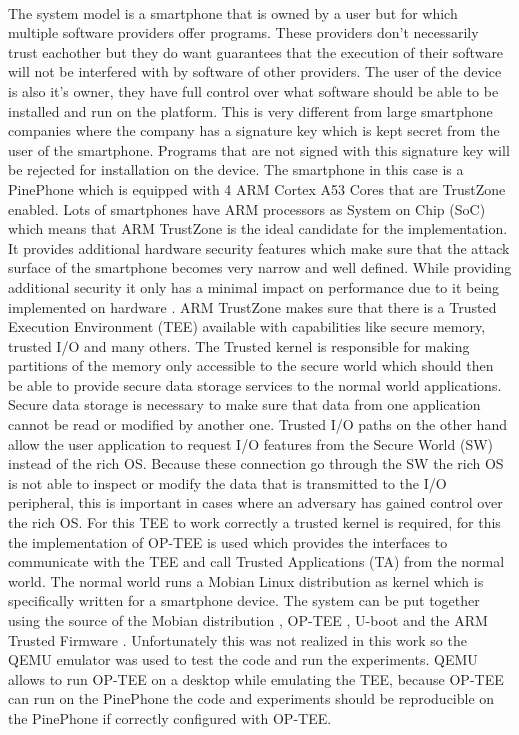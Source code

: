 \documentclass{report}
\begin{document}
\paragraph*{}
The system model is a smartphone that is owned by a user but for which multiple software providers offer programs. These providers don't necessarily trust eachother but they do want guarantees that the execution of their software will not be interfered with by software of other providers. The user of the device is also it's owner, they have full control over what software should be able to be installed and run on the platform. This is very different from large smartphone companies where the company has a signature key which is kept secret from the user of the smartphone. Programs that are not signed with this signature key will be rejected for installation on the device. The smartphone in this case is a PinePhone which is equipped with 4 ARM Cortex A53 Cores that are TrustZone enabled. Lots of smartphones have ARM processors as System on Chip (SoC) which means that ARM TrustZone is the ideal candidate for the implementation. It provides additional hardware security features which make sure that the attack surface of the smartphone becomes very narrow and well defined. While providing additional security it only has a minimal impact on performance due to it being implemented on hardware \cite{AmacherJulien2019Otpo} \cite{HuaZhichao2021Tpcf}. ARM TrustZone makes sure that there is a Trusted Execution Environment (TEE) available with capabilities like secure memory, trusted I/O and many others. The Trusted kernel is responsible for making partitions of the memory only accessible to the secure world which should then be able to provide secure data storage services to the normal world applications. Secure data storage is necessary to make sure that data from one application cannot be read or modified by another one. Trusted I/O paths on the other hand allow the user application to request I/O features from the Secure World (SW) instead of the rich OS. Because these connection go through the SW the rich OS is not able to inspect or modify the data that is transmitted to the I/O peripheral, this is important in cases where an adversary has gained control over the rich OS. For this TEE to work correctly a trusted kernel is required, for this the implementation of OP-TEE is used which provides the interfaces to communicate with the TEE and call Trusted Applications (TA) from the normal world. The normal world runs a Mobian Linux distribution as kernel which is specifically written for a smartphone device. The system can be put together using the source of the Mobian distribution \cite{mobian}, OP-TEE \cite{OPTEEgit}, U-boot \cite{u-boot} and the ARM Trusted Firmware \cite{ARMfirmware}. Unfortunately this was not realized in this work so the QEMU emulator \cite{QEMU} was used to test the code and run the experiments. QEMU allows to run OP-TEE on a desktop while emulating the TEE, because OP-TEE can run on the PinePhone the code and experiments should be reproducible on the PinePhone if correctly configured with OP-TEE.
\end{document}
